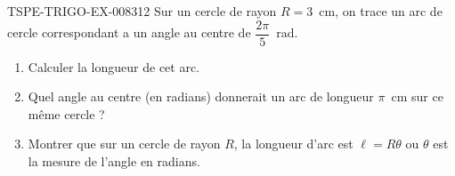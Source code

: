 \begin{exercice}{TSPE-TRIGO-EX-008}{3}{12}
Sur un cercle de rayon $R = 3$~cm, on trace un arc de cercle correspondant a un angle au centre de $\dfrac{2\pi}{5}$~rad.
\begin{enumerate}
  \item Calculer la longueur de cet arc.
  \item Quel angle au centre (en radians) donnerait un arc de longueur $\pi$~cm sur ce même cercle ?
  \item Montrer que sur un cercle de rayon $R$, la longueur d'arc est $\ell = R\theta$ ou $\theta$ est la mesure de l'angle en radians.
\end{enumerate}
\end{exercice}
